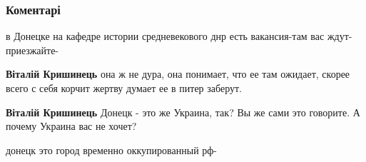  
 
 
 
 
\subsubsection{Коментарі}
\label{sec:23_07_2021.fb.bilchenko_evgenia.1.biografia.cmt}

\begin{itemize}
 
в Донецке на кафедре истории средневекового днр есть вакансия-там вас ждут-приезжайте-
\begin{itemize}
 
\textbf{Віталій Кришинець} она ж не дура, она понимает, что ее там ожидает, скорее всего с себя корчит жертву думает ее в питер заберут.

 
\textbf{Віталій Кришинець} Донецк - это же Украина, так? Вы же сами это говорите. А почему Украина вас не хочет?

 
донецк это город временно оккупированный рф-

 

\end{itemize}
\end{itemize}

